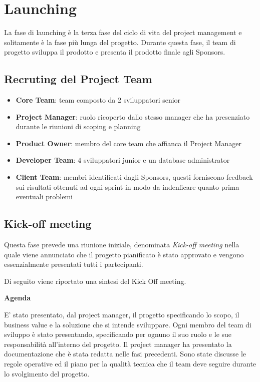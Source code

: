 \chapter{Launching}
La fase di launching è la terza fase del ciclo di vita del project management 
e solitamente è la fase più lunga del progetto. 
Durante questa fase, il team di progetto sviluppa il prodotto e presenta il prodotto 
finale agli Sponsors.



\section{Recruting del Project Team}

\begin{itemize}
    \item \textbf{Core Team}: team composto da 2 sviluppatori senior
    \item \textbf{Project Manager}: ruolo ricoperto dallo stesso manager che ha
    presenziato durante le riunioni di scoping e planning
    \item \textbf{Product Owner}: membro del core team che affianca il Project Manager
    \item \textbf{Developer Team}: 4 sviluppatori junior e un database administrator
    \item \textbf{Client Team}: membri identificati dagli Sponsors, questi forniscono feedback
    sui risultati ottenuti ad ogni sprint in modo da indenficare quanto prima eventuali problemi
\end{itemize}

\section{Kick-off meeting}
Questa fase prevede una riunione iniziale, denominata \textit{Kick-off meeting} nella
quale viene annunciato che il progetto pianificato è stato approvato e vengono essenzialmente 
presentati tutti i partecipanti.

Di seguito viene riportato una sintesi del Kick Off meeting.

\textbf{Agenda}

E' stato presentato, dal project manager, il progetto specificando lo scopo, il business value e 
la soluzione che si intende sviluppare. Ogni membro del team di sviluppo è stato presentando, 
specificando per ognuno il suo ruolo e le sue responsabilità all'interno del progetto.
Il project manager ha presentato la documentazione che è stata redatta nelle fasi precedenti.
Sono state discusse le regole operative ed il piano per la qualità tecnica che il team deve seguire 
durante lo svolgimento del progetto.

